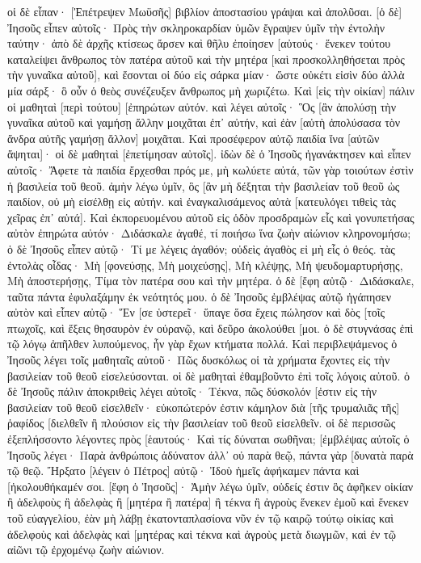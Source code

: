 οἱ δὲ εἶπαν· [Ἐπέτρεψεν Μωϋσῆς] βιβλίον ἀποστασίου γράψαι καὶ ἀπολῦσαι. 
[ὁ δὲ] Ἰησοῦς εἶπεν αὐτοῖς· Πρὸς τὴν σκληροκαρδίαν ὑμῶν ἔγραψεν ὑμῖν τὴν ἐντολὴν ταύτην· 
ἀπὸ δὲ ἀρχῆς κτίσεως ἄρσεν καὶ θῆλυ ἐποίησεν [αὐτούς· 
ἕνεκεν τούτου καταλείψει ἄνθρωπος τὸν πατέρα αὐτοῦ καὶ τὴν μητέρα [καὶ προσκολληθήσεται πρὸς τὴν γυναῖκα αὐτοῦ], 
καὶ ἔσονται οἱ δύο εἰς σάρκα μίαν· ὥστε οὐκέτι εἰσὶν δύο ἀλλὰ μία σάρξ· 
ὃ οὖν ὁ θεὸς συνέζευξεν ἄνθρωπος μὴ χωριζέτω. 
Καὶ [εἰς τὴν οἰκίαν] πάλιν οἱ μαθηταὶ [περὶ τούτου] [ἐπηρώτων αὐτόν. 
καὶ λέγει αὐτοῖς· Ὃς [ἂν ἀπολύσῃ τὴν γυναῖκα αὐτοῦ καὶ γαμήσῃ ἄλλην μοιχᾶται ἐπ᾽ αὐτήν, 
καὶ ἐὰν [αὐτὴ ἀπολύσασα τὸν ἄνδρα αὐτῆς γαμήσῃ ἄλλον] μοιχᾶται. 
Καὶ προσέφερον αὐτῷ παιδία ἵνα [αὐτῶν ἅψηται]· οἱ δὲ μαθηταὶ [ἐπετίμησαν αὐτοῖς]. 
ἰδὼν δὲ ὁ Ἰησοῦς ἠγανάκτησεν καὶ εἶπεν αὐτοῖς· Ἄφετε τὰ παιδία ἔρχεσθαι πρός με, μὴ κωλύετε αὐτά, τῶν γὰρ τοιούτων ἐστὶν ἡ βασιλεία τοῦ θεοῦ. 
ἀμὴν λέγω ὑμῖν, ὃς [ἂν μὴ δέξηται τὴν βασιλείαν τοῦ θεοῦ ὡς παιδίον, οὐ μὴ εἰσέλθῃ εἰς αὐτήν. 
καὶ ἐναγκαλισάμενος αὐτὰ [κατευλόγει τιθεὶς τὰς χεῖρας ἐπ᾽ αὐτά]. 
Καὶ ἐκπορευομένου αὐτοῦ εἰς ὁδὸν προσδραμὼν εἷς καὶ γονυπετήσας αὐτὸν ἐπηρώτα αὐτόν· Διδάσκαλε ἀγαθέ, τί ποιήσω ἵνα ζωὴν αἰώνιον κληρονομήσω; 
ὁ δὲ Ἰησοῦς εἶπεν αὐτῷ· Τί με λέγεις ἀγαθόν; οὐδεὶς ἀγαθὸς εἰ μὴ εἷς ὁ θεός. 
τὰς ἐντολὰς οἶδας· Μὴ [φονεύσῃς, Μὴ μοιχεύσῃς], Μὴ κλέψῃς, Μὴ ψευδομαρτυρήσῃς, Μὴ ἀποστερήσῃς, Τίμα τὸν πατέρα σου καὶ τὴν μητέρα. 
ὁ δὲ [ἔφη αὐτῷ· Διδάσκαλε, ταῦτα πάντα ἐφυλαξάμην ἐκ νεότητός μου. 
ὁ δὲ Ἰησοῦς ἐμβλέψας αὐτῷ ἠγάπησεν αὐτὸν καὶ εἶπεν αὐτῷ· Ἕν [σε ὑστερεῖ· ὕπαγε ὅσα ἔχεις πώλησον καὶ δὸς [τοῖς πτωχοῖς, καὶ ἕξεις θησαυρὸν ἐν οὐρανῷ, καὶ δεῦρο ἀκολούθει [μοι. 
ὁ δὲ στυγνάσας ἐπὶ τῷ λόγῳ ἀπῆλθεν λυπούμενος, ἦν γὰρ ἔχων κτήματα πολλά. 
Καὶ περιβλεψάμενος ὁ Ἰησοῦς λέγει τοῖς μαθηταῖς αὐτοῦ· Πῶς δυσκόλως οἱ τὰ χρήματα ἔχοντες εἰς τὴν βασιλείαν τοῦ θεοῦ εἰσελεύσονται. 
οἱ δὲ μαθηταὶ ἐθαμβοῦντο ἐπὶ τοῖς λόγοις αὐτοῦ. ὁ δὲ Ἰησοῦς πάλιν ἀποκριθεὶς λέγει αὐτοῖς· Τέκνα, πῶς δύσκολόν [ἐστιν εἰς τὴν βασιλείαν τοῦ θεοῦ εἰσελθεῖν· 
εὐκοπώτερόν ἐστιν κάμηλον διὰ [τῆς τρυμαλιᾶς τῆς] ῥαφίδος [διελθεῖν ἢ πλούσιον εἰς τὴν βασιλείαν τοῦ θεοῦ εἰσελθεῖν. 
οἱ δὲ περισσῶς ἐξεπλήσσοντο λέγοντες πρὸς [ἑαυτούς· Καὶ τίς δύναται σωθῆναι; 
[ἐμβλέψας αὐτοῖς ὁ Ἰησοῦς λέγει· Παρὰ ἀνθρώποις ἀδύνατον ἀλλ᾽ οὐ παρὰ θεῷ, πάντα γὰρ [δυνατὰ παρὰ τῷ θεῷ. 
Ἤρξατο [λέγειν ὁ Πέτρος] αὐτῷ· Ἰδοὺ ἡμεῖς ἀφήκαμεν πάντα καὶ [ἠκολουθήκαμέν σοι. 
[ἔφη ὁ Ἰησοῦς]· Ἀμὴν λέγω ὑμῖν, οὐδείς ἐστιν ὃς ἀφῆκεν οἰκίαν ἢ ἀδελφοὺς ἢ ἀδελφὰς ἢ [μητέρα ἢ πατέρα] ἢ τέκνα ἢ ἀγροὺς ἕνεκεν ἐμοῦ καὶ ἕνεκεν τοῦ εὐαγγελίου, 
ἐὰν μὴ λάβῃ ἑκατονταπλασίονα νῦν ἐν τῷ καιρῷ τούτῳ οἰκίας καὶ ἀδελφοὺς καὶ ἀδελφὰς καὶ [μητέρας καὶ τέκνα καὶ ἀγροὺς μετὰ διωγμῶν, καὶ ἐν τῷ αἰῶνι τῷ ἐρχομένῳ ζωὴν αἰώνιον. 
